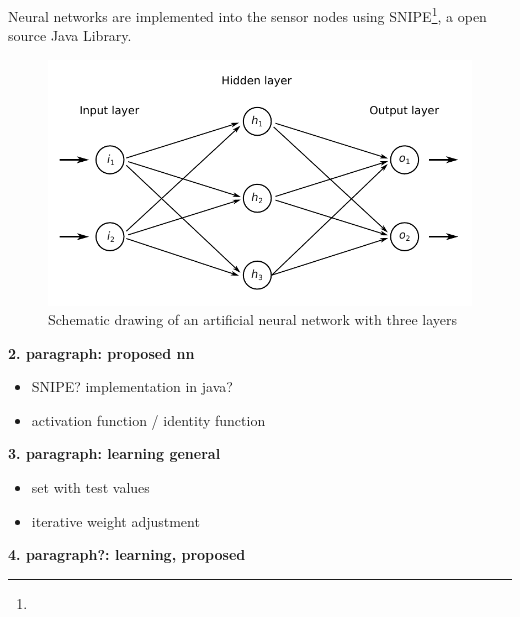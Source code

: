 \documentclass[12pt,a4paper]{scrartcl}
\begin{document}
Neural networks are implemented into the sensor nodes using SNIPE\footnote{}, a open source Java Library.
\begin{figure}[ht]
    \centering
    \includegraphics{figures/neuralnetwork.pdf}
    \caption{Schematic drawing of an artificial neural network with three layers}
    \label{fig:neuralnetwork}
\end{figure}



\textbf{2. paragraph: proposed nn}

\begin{itemize}
\item SNIPE? implementation in java?
\item activation function / identity function
\end{itemize}

\textbf{3. paragraph: learning general}

\begin{itemize}
\item set with test values
\item iterative weight adjustment
\end{itemize}

\textbf{4. paragraph?: learning, proposed}

\end{document}
